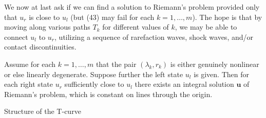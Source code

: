We now at last ask if we can find a solution to Riemann's problem provided only that $u_r$ is close to $u_l$ (but (43) may fail for each $k=1,\ldots,m$). The hope is that by moving along various paths $T_k$ for different values of $k$, we may be able to connect $u_l$ to $u_r$, utilizing a sequence of rarefaction waves, shock waves, and/or contact discontinuities.

\begin{theorem}
\label{thm:local-solution-riemann-problem}
Assume for each $k=1,\ldots,m$ that the pair $(\lambda_k, r_k)$ is either genuinely nonlinear or else linearly degenerate. Suppose further the left state $u_l$ is given. Then for each right state $u_r$ sufficiently close to $u_l$ there exists an integral solution $\mathbf{u}$ of Riemann's problem, which is constant on lines through the origin.
\end{theorem}

\begin{figure}[h]\centering
\end{figure}

Structure of the T-curve

